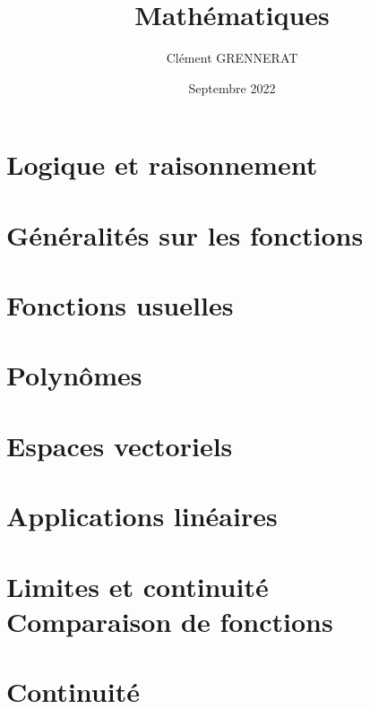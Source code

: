\documentclass[13pt, twoside, a4paper, french]{report}
\newcommand*{\getSubject}{Mathématiques}
\begin{document}
    \title{\getSubject}
    \author{Clément GRENNERAT}
    \date{Septembre 2022}
    \tableofcontents

    \chapter{Logique et raisonnement}\label{ch:logique-et-raisonnement}
        


    \chapter{Généralités sur les fonctions}\label{ch:generalites-sur-les-fonctions}
        


    \chapter{Fonctions usuelles}\label{ch:fonctions-usuelles}
        


    \chapter{Polynômes}\label{ch:polynomes}
        


    \chapter{Espaces vectoriels}\label{ch:espaces-vectoriels}
        


    \chapter{Applications linéaires}\label{ch:applications-lineaires}
        


    \chapter{Limites et continuité\\Comparaison de fonctions}\label{ch:limites-est-continuite---comparaison-de-fonctions}
        


    \chapter{Continuité}\label{ch:continuite}
        
\end{document}
